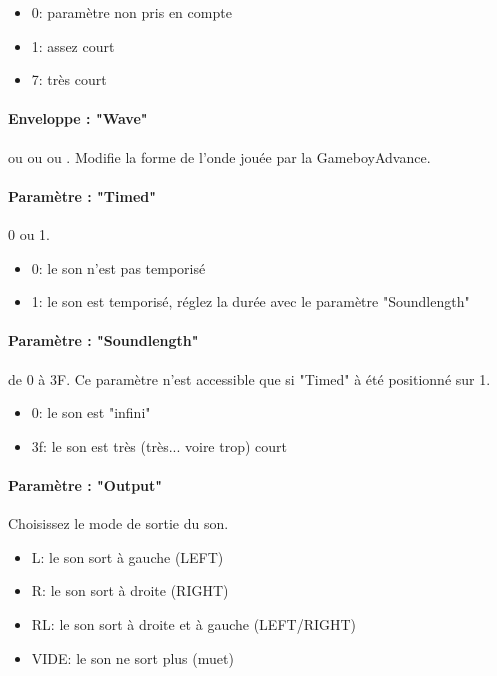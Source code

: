 \documentclass[12pt,a4paper]{article}
\begin{document}
    \begin{itemize}
        \item{0: paramètre non pris en compte}
        \item{1: assez court}
        \item{7: très court}
    \end{itemize}

    \paragraph{Enveloppe : "Wave"}  ou  ou  ou .
    Modifie la forme de l'onde jouée par la GameboyAdvance.

    \paragraph{Paramètre : "Timed"} 0 ou 1.
    \medskip

    \begin{itemize}
        \item{0: le son n'est pas temporisé}
        \item{1: le son est temporisé, réglez la durée avec le paramètre "Soundlength"}
    \end{itemize}

    \paragraph{Paramètre : "Soundlength"} de 0 à 3F.
    Ce paramètre n'est accessible que si "Timed" à été positionné sur 1.
    \medskip

    \begin{itemize}
        \item{0: le son est "infini"}
        \item{3f: le son est très (très... voire trop) court}
    \end{itemize}

    \paragraph{Paramètre : "Output"} Choisissez le mode de sortie du son.
    \medskip

    \begin{itemize}
        \item{L: le son sort à gauche (LEFT)}
        \item{R: le son sort à droite (RIGHT)}
        \item{RL: le son sort à droite et à gauche (LEFT/RIGHT)}
        \item{VIDE: le son ne sort plus (muet)}
    \end{itemize}
\end{document}
